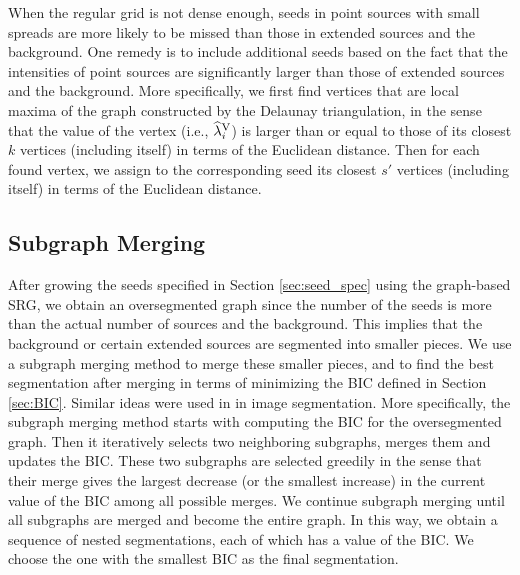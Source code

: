 \documentclass{aastex61}
\begin{document}
When the regular grid is not dense enough, seeds in point sources with small spreads are more likely to be missed than those in extended sources and the background. One remedy is to include additional seeds based on the fact that the intensities of point sources are significantly larger than those of extended sources and the background. More specifically, we first find vertices that are local maxima of the graph constructed by the Delaunay triangulation, in the sense that the value of the vertex (i.e., $\widehat{\lambda}_i^{\rm V}$) is larger than or equal to those of its closest $k$ vertices (including itself) in terms of the Euclidean distance. Then for each found vertex, we assign to the corresponding seed its closest $s'$  vertices (including itself) in terms of the Euclidean distance.

\subsection{Subgraph Merging}
After growing the seeds specified in Section \ref{sec:seed_spec} using the graph-based SRG, we obtain an oversegmented graph since the number of the seeds is more than the actual number of sources and the background. This implies that the background or certain extended sources are segmented into smaller pieces. We use a subgraph merging method to merge these smaller pieces, and to find the best segmentation after merging in terms of minimizing the BIC defined in Section \ref{sec:BIC}. Similar ideas were used in \citet{Lee-00, Peng-11} in image segmentation. More specifically, the subgraph merging method starts with computing the BIC for the oversegmented graph. Then it iteratively selects two neighboring subgraphs, merges them and updates the BIC. These two subgraphs are selected greedily in the sense that their merge gives the largest decrease (or the smallest increase) in the current value of the BIC among all possible merges. We continue subgraph merging until all subgraphs are merged and become the entire graph. In this way, we obtain a sequence of nested segmentations, each of which has a value of the BIC. We choose the one with the smallest BIC as the final segmentation.

\newpage




\end{document}
